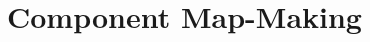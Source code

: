 \documentclass[../../thesis.tex]{subfiles}
\begin{document}
\chapter{Component Map-Making}

\minitoc
\end{document}
